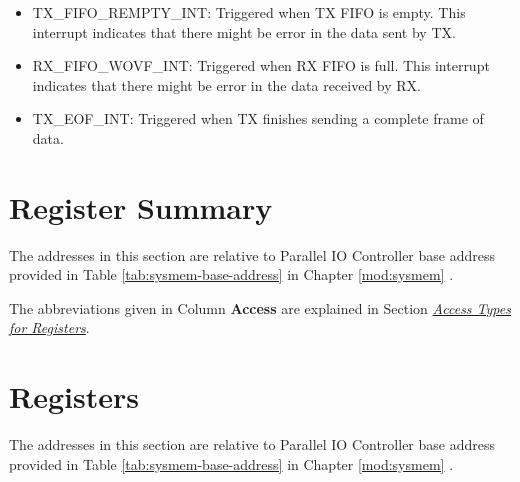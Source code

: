 \documentclass[main\_\_EN.tex]{subfiles}
\begin{document}
\begin{itemize}
\item \label{int:TXFIFOREMPTYINT}TX\_FIFO\_REMPTY\_INT: Triggered when TX FIFO is empty. This interrupt indicates that there might be error in the data sent by TX.
\item \label{int:RXFIFOWOVFINT}RX\_FIFO\_WOVF\_INT: Triggered when RX FIFO is full. This interrupt indicates that there might be error in the data received by RX.
\item \label{int:TXEOFINT}TX\_EOF\_INT: Triggered when TX finishes sending a complete frame of data.
\end{itemize}






\clearpage
\hypertarget{parlio-reg-summ}{}
\section{Register Summary}
\label{sec:parlio-reg-summ}

The addresses in this section are relative to Parallel IO Controller base address provided in Table \ref{tab:sysmem-base-address} in Chapter \ref{mod:sysmem} \textit{}.

The abbreviations given in Column \textbf{Access} are explained in Section \hyperref[glossary-access-types]{\textit{Access Types for Registers}}.






\clearpage
\section{Registers}

The addresses in this section are relative to Parallel IO Controller base address provided in Table \ref{tab:sysmem-base-address} in Chapter \ref{mod:sysmem} \textit{}.


\end{document}
